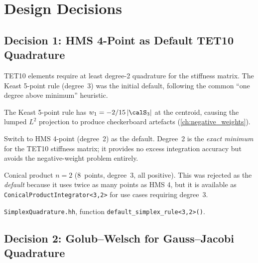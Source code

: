 \section{Design Decisions}
\label{sec:decisions}


\subsection{Decision 1: HMS 4-Point as Default TET10 Quadrature}
\label{sec:dec_hms4}

\begin{description}[leftmargin=0pt,style=nextline]
  \item[Context] TET10 elements require at least degree-2 quadrature for the
    stiffness matrix.  The Keast 5-point rule (degree~3) was the initial
    default, following the common ``one degree above minimum'' heuristic.

  \item[Problem] The Keast 5-point rule has $w_1 = -2/15\,|\calS_3|$ at the
    centroid, causing the lumped $L^2$ projection to produce checkerboard
    artefacts (\cref{ch:negative_weights}).

  \item[Decision] Switch to HMS 4-point (degree~2) as the default.  Degree~2
    is the \emph{exact minimum} for the TET10 stiffness matrix; it provides
    no excess integration accuracy but avoids the negative-weight problem
    entirely.

  \item[Alternative considered] Conical product $n=2$ (8~points, degree~3,
    all positive).  This was rejected as the \emph{default} because it uses
    twice as many points as HMS 4, but it is available as
    \texttt{ConicalProductIntegrator<3,2>} for use cases requiring degree~3.

  \item[Source] \texttt{SimplexQuadrature.hh}, function
    \texttt{default\_simplex\_rule<3,2>()}.
\end{description}


\subsection{Decision 2: Golub--Welsch for Gauss--Jacobi Quadrature}
\label{sec:dec_gw}

